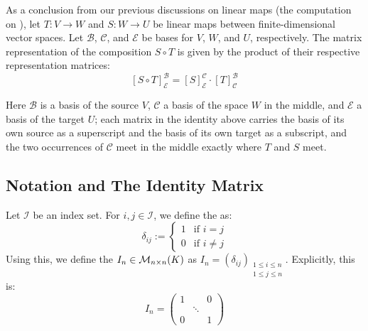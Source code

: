 As a conclusion from our previous discussions on linear maps (the computation on ), let $T: V \to W$ and $S: W \to U$ be linear maps between finite-dimensional vector spaces. Let $\mathcal{B}$, $\mathcal{C}$, and $\mathcal{E}$ be bases for $V$, $W$, and $U$, respectively. The matrix representation of the composition $S \circ T$ is given by the product of their respective representation matrices:
\[
    [S \circ T]_{\mathcal{E}}^{\mathcal{B}} = [S]_{\mathcal{E}}^{\mathcal{C}} \cdot [T]_{\mathcal{C}}^{\mathcal{B}}
\]

\begin{center}
\end{center}
Here $\mathcal{B}$ is a basis of the source $V$, $\mathcal{C}$ a basis of the space $W$ in the middle, and $\mathcal{E}$ a basis of the target $U$; each matrix in the identity above carries the basis of its own source as a superscript and the basis of its own target as a subscript, and the two occurrences of $\mathcal{C}$ meet in the middle exactly where $T$ and $S$ meet.


\subsection{Notation and The Identity Matrix}

Let $\mathcal{I}$ be an index set. For $i, j \in \mathcal{I}$, we define the  as:
\begin{equation*}
    \delta_{ij} := \begin{cases} 1 & \text{if } i = j \\ 0 & \text{if } i \neq j \end{cases}
\end{equation*}
Using this, we define the  $I_n \in \mathcal{M}_{n \times n}(K)$ as $I_n = (\delta_{ij})_{\substack{1 \le i \le n \\ 1 \le j \le n}}$. Explicitly, this is:
\begin{equation*}
    I_n = \begin{pmatrix} 1 & & 0 \\ & \ddots & \\ 0 & & 1 \end{pmatrix}
\end{equation*}

